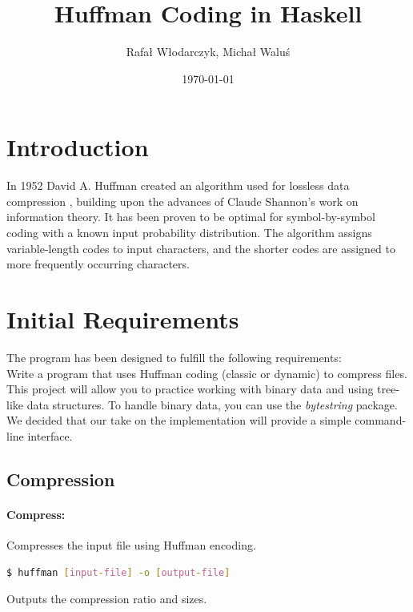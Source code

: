 \documentclass{article}
\begin{document}
\title{Huffman Coding in Haskell}
\author{Rafał Włodarczyk, Michał Waluś}
\date{\today}

\maketitle

\tableofcontents
\newpage

\section{Introduction}
In 1952 David A. Huffman created an algorithm used for lossless data compression \cite{huffman1952method}, 
building upon the advances of Claude Shannon's work on information theory.
It has been proven to be optimal for symbol-by-symbol coding with a known
input probability distribution. The algorithm assigns variable-length codes to input characters, and the shorter codes are assigned to more frequently occurring characters.

\section{Initial Requirements}

The program has been designed to fulfill the following requirements:\\

Write a program that uses Huffman coding (classic or dynamic) to compress files.
This project will allow you to practice working with binary data and using tree-like data structures.
To handle binary data, you can use the \textit{bytestring} package.\\

\noindent
We decided that our take on the implementation will provide a simple command-line interface.

\subsection{Compression}

\paragraph{Compress:} Compresses the input file using Huffman encoding.
\begin{lstlisting}[language=bash]
$ huffman [input-file] -o [output-file]
\end{lstlisting}
Outputs the compression ratio and sizes.
\end{document}
